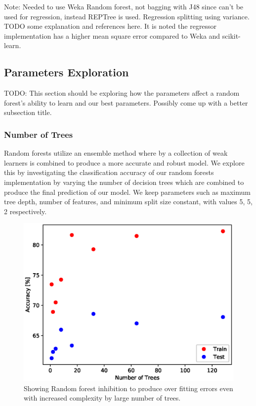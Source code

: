 \documentclass{article} %
\begin{document}
Note: Needed to use Weka Random forest, not bagging with J48 since can't be used for regression, instead REPTree is used.
Regression splitting using variance. TODO some explanation and references here. It is noted the regressor implementation has a higher mean square error compared to Weka and scikit-learn.

\subsection{Parameters Exploration}
TODO: This section should be exploring how the parameters affect a random forest's ability to learn and our best parameters.  Possibly come up with a better subsection title.

\subsubsection{Number of Trees}

Random forests utilize an ensemble method where by a collection of weak learners is combined to produce a more accurate and robust model. We explore this by investigating the classification accuracy of our random forests implementation by varying the number of decision trees which are combined to produce the final prediction of our model. We keep parameters such as maximum tree depth, number of features, and minimum split size constant, with values 5, 5, 2 respectively. 

\begin{figure}[ht]
\begin{center}
\includegraphics[scale=0.4]{n_trees}
\end{center}
\caption{Showing Random forest inhibition to produce over fitting errors even with increased complexity by large number of trees.}
\label{fig:n_trees}
\end{figure}
\end{document}
